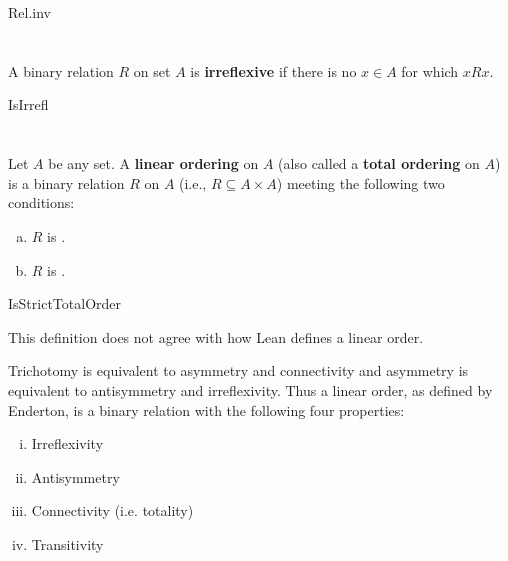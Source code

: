 \documentclass{report}
\begin{document}
    {Rel.inv}

\section{}%

  A binary relation $R$ on set $A$ is \textbf{irreflexive} if there is no
    $x \in A$ for which $xRx$.

    {IsIrrefl}

\section{}

  Let $A$ be any set.
  A \textbf{linear ordering} on $A$ (also called a \textbf{total ordering} on
    $A$) is a binary relation $R$ on $A$ (i.e., $R \subseteq A \times A$)
    meeting the following two conditions:

  \begin{enumerate}[(a)]
    \item $R$ is .
    \item $R$ is .
  \end{enumerate}

    {IsStrictTotalOrder}

  \begin{note}
    This definition does not agree with how Lean defines a linear order.

    \vspace{6pt}
    Trichotomy is equivalent to asymmetry and connectivity and asymmetry is
      equivalent to antisymmetry and irreflexivity.
    Thus a linear order, as defined by Enderton, is a binary relation with the
      following four properties:

    \vspace{6pt}
    \begin{enumerate}[(i)]
      \item Irreflexivity
      \item Antisymmetry
      \item Connectivity (i.e. totality)
      \item Transitivity
    \end{enumerate}
  \end{note}
\end{document}
